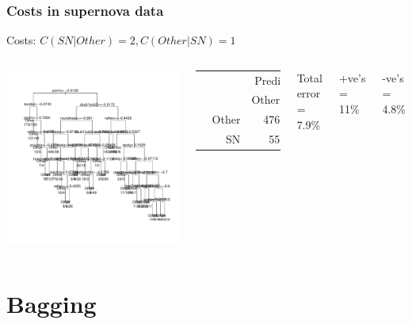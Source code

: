 \documentclass{beamer}
\begin{document}
\begin{frame}
	\frametitle{Costs in supernova data}
	Costs: $C(SN|Other)=2, C(Other|SN)=1$
	\begin{columns}[c] 
			\includegraphics{treec1.pdf}
				\begin{table}
				\begin{tabular}{cr|rr}
				& & \multicolumn{2}{c}{Prediction}\\
				& & Other & SN\\
				\hline
				\multirow{2}{*}{\rotatebox{90}{Actual}} & Other &  476 &  24\\
				& SN & 55 &  445\\
				\end{tabular}
				\end{table}	
				Total error = 7.9\%
				
				+ve's = 11\%
				
				-ve's = 4.8\%
			\end{columns}
\end{frame}


\section{Bagging}
\end{document}
